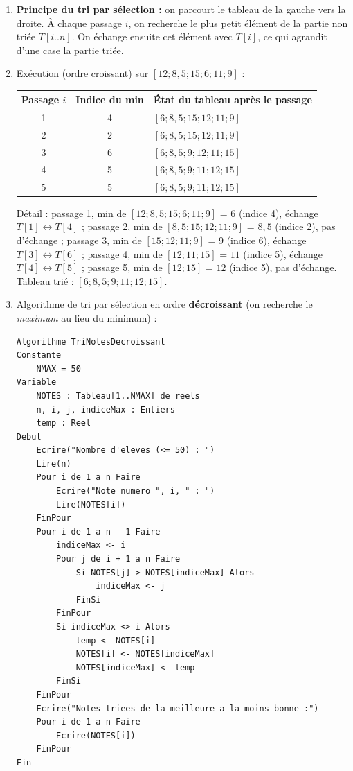 \documentclass[11pt]{article}
\begin{document}
\begin{corrige}
\begin{enumerate}
\item \textbf{Principe du tri par sélection :} on parcourt le tableau de la gauche vers la droite. À chaque passage $i$, on recherche le plus petit élément de la partie non triée $T[i..n]$. On échange ensuite cet élément avec $T[i]$, ce qui agrandit d'une case la partie triée.

\item Exécution (ordre croissant) sur $[12 ; 8,5 ; 15 ; 6 ; 11 ; 9]$ :

\begin{center}
\begin{tabular}{|c|c|l|}
\hline
\rowcolor{popblueL} Passage $i$ & Indice du min & État du tableau après le passage \\
\hline
1 & 4 & $[6 ; 8,5 ; 15 ; 12 ; 11 ; 9]$ \\
\hline
2 & 2 & $[6 ; 8,5 ; 15 ; 12 ; 11 ; 9]$ \\
\hline
3 & 6 & $[6 ; 8,5 ; 9 ; 12 ; 11 ; 15]$ \\
\hline
4 & 5 & $[6 ; 8,5 ; 9 ; 11 ; 12 ; 15]$ \\
\hline
5 & 5 & $[6 ; 8,5 ; 9 ; 11 ; 12 ; 15]$ \\
\hline
\end{tabular}
\end{center}

Détail : passage 1, min de $[12 ; 8,5 ; 15 ; 6 ; 11 ; 9]$ = $6$ (indice 4), échange $T[1] \leftrightarrow T[4]$ ; passage 2, min de $[8,5 ; 15 ; 12 ; 11 ; 9]$ = $8,5$ (indice 2), pas d'échange ; passage 3, min de $[15 ; 12 ; 11 ; 9]$ = $9$ (indice 6), échange $T[3] \leftrightarrow T[6]$ ; passage 4, min de $[12 ; 11 ; 15]$ = $11$ (indice 5), échange $T[4] \leftrightarrow T[5]$ ; passage 5, min de $[12 ; 15]$ = $12$ (indice 5), pas d'échange. Tableau trié : $[6 ; 8,5 ; 9 ; 11 ; 12 ; 15]$.

\item Algorithme de tri par sélection en ordre \textbf{décroissant} (on recherche le \emph{maximum} au lieu du minimum) :

\begin{lstlisting}
Algorithme TriNotesDecroissant
Constante
    NMAX = 50
Variable
    NOTES : Tableau[1..NMAX] de reels
    n, i, j, indiceMax : Entiers
    temp : Reel
Debut
    Ecrire("Nombre d'eleves (<= 50) : ")
    Lire(n)
    Pour i de 1 a n Faire
        Ecrire("Note numero ", i, " : ")
        Lire(NOTES[i])
    FinPour
    Pour i de 1 a n - 1 Faire
        indiceMax <- i
        Pour j de i + 1 a n Faire
            Si NOTES[j] > NOTES[indiceMax] Alors
                indiceMax <- j
            FinSi
        FinPour
        Si indiceMax <> i Alors
            temp <- NOTES[i]
            NOTES[i] <- NOTES[indiceMax]
            NOTES[indiceMax] <- temp
        FinSi
    FinPour
    Ecrire("Notes triees de la meilleure a la moins bonne :")
    Pour i de 1 a n Faire
        Ecrire(NOTES[i])
    FinPour
Fin
\end{lstlisting}


\end{enumerate}
\end{corrige}
\end{document}
